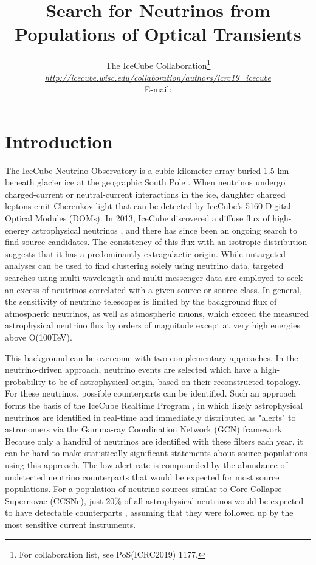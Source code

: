 \documentclass{PoS}
\title{Search for Neutrinos from Populations of Optical Transients}
\author{
The IceCube Collaboration\footnote{For collaboration list, see PoS(ICRC2019) 1177.}\\
{\itshape \href{http://icecube.wisc.edu/collaboration/authors/icrc19_icecube}{http://icecube.wisc.edu/collaboration/authors/icrc19\_icecube}}\\
E-mail: \email{robert.stein@desy.de}
}
\begin{document}
	
\section{Introduction}

The IceCube Neutrino Observatory is a cubic-kilometer array buried 1.5 km beneath glacier ice at the geographic South Pole \cite{Aartsen:2016nxy}. When neutrinos undergo charged-current  or neutral-current interactions in the ice, daughter charged leptons emit Cherenkov light that can be detected by IceCube's 5160 Digital Optical Modules (DOMs). In 2013, IceCube discovered a diffuse flux of high-energy astrophysical neutrinos \cite{Aartsen:2013jdh}, and there has since been an ongoing search to find source candidates. The consistency of this flux with an isotropic distribution suggests that it has a predominantly extragalactic origin. While untargeted analyses can be used to find clustering solely using neutrino data, targeted searches using multi-wavelength and multi-messenger data are employed to seek an excess of neutrinos correlated with a given source or source class. In general, the sensitivity of neutrino telescopes is limited by the background flux of atmospheric neutrinos, as well as atmospheric muons, which exceed the measured astrophysical neutrino flux by orders of magnitude except at very high energies above O(100TeV). 

This background can be overcome with two complementary approaches. In the neutrino-driven approach, neutrino events are selected which have a high-probability to be of astrophysical origin, based on their reconstructed topology. For these neutrinos, possible counterparts can be identified. Such an approach forms the basis of the IceCube Realtime Program \cite{Aartsen:2016lmt}, in which likely astrophysical neutrinos are identified in real-time and immediately distributed as "alerts" to astronomers via the Gamma-ray Coordination Network (GCN) framework. Because only a handful of neutrinos are identified with these filters each year, it can be hard to make statistically-significant statements about source populations using this approach. The low alert rate is compounded by the abundance of undetected neutrino counterparts that would be expected for most source populations. For a population of neutrino sources similar to Core-Collapse Supernovae (CCSNe), just 20\% of all astrophysical neutrinos would be expected to have detectable counterparts \cite{Kankare:2019bzi}, assuming that they were followed up by the most sensitive current instruments.
\end{document}
